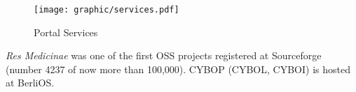 \begin{figure}[ht]
    \begin{center}
        \texttt{[image: graphic/services.pdf]}
        \caption{Portal Services}
        \label{services_figure}
    \end{center}
\end{figure}

\emph{Res Medicinae} was one of the first OSS projects registered at
Sourceforge (number 4237 of now more than 100,000). CYBOP (CYBOL, CYBOI) is
hosted at BerliOS.
